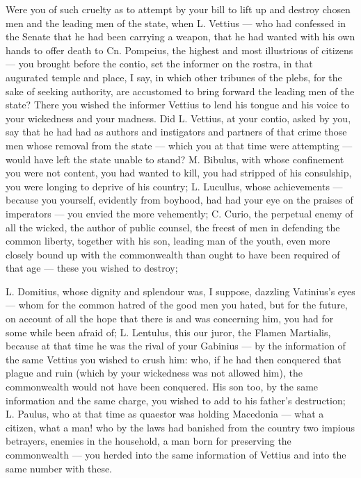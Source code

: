  Were you of such cruelty as to attempt by your bill to lift up and destroy chosen men and the leading men of the state, when L. Vettius --- who had confessed in the Senate that he had been carrying a weapon, that he had wanted with his own hands to offer death to Cn. Pompeius, the highest and most illustrious of citizens --- you brought before the contio, set the informer on the rostra, in that augurated temple and place, I say, in which other tribunes of the plebs, for the sake of seeking authority, are accustomed to bring forward the leading men of the state? There you wished the informer Vettius to lend his tongue and his voice to your wickedness and your madness. Did L. Vettius, at your contio, asked by you, say that he had had as authors and instigators and partners of that crime those men whose removal from the state --- which you at that time were attempting --- would have left the state unable to stand? M. Bibulus, with whose confinement you were not content, you had wanted to kill, you had stripped of his consulship, you were longing to deprive of his country; L. Lucullus, whose achievements --- because you yourself, evidently from boyhood, had had your eye on the praises of imperators --- you envied the more vehemently; C. Curio, the perpetual enemy of all the wicked, the author of public counsel, the freest of men in defending the common liberty, together with his son, leading man of the youth, even more closely bound up with the commonwealth than ought to have been required of that age --- these you wished to destroy;

 L. Domitius, whose dignity and splendour was, I suppose, dazzling Vatinius's eyes --- whom for the common hatred of the good men you hated, but for the future, on account of all the hope that there is and was concerning him, you had for some while been afraid of; L. Lentulus, this our juror, the Flamen Martialis, because at that time he was the rival of your Gabinius --- by the information of the same Vettius you wished to crush him: who, if he had then conquered that plague and ruin (which by your wickedness was not allowed him), the commonwealth would not have been conquered. His son too, by the same information and the same charge, you wished to add to his father's destruction; L. Paulus, who at that time as quaestor was holding Macedonia --- what a citizen, what a man! who by the laws had banished from the country two impious betrayers, enemies in the household, a man born for preserving the commonwealth --- you herded into the same information of Vettius and into the same number with these.

